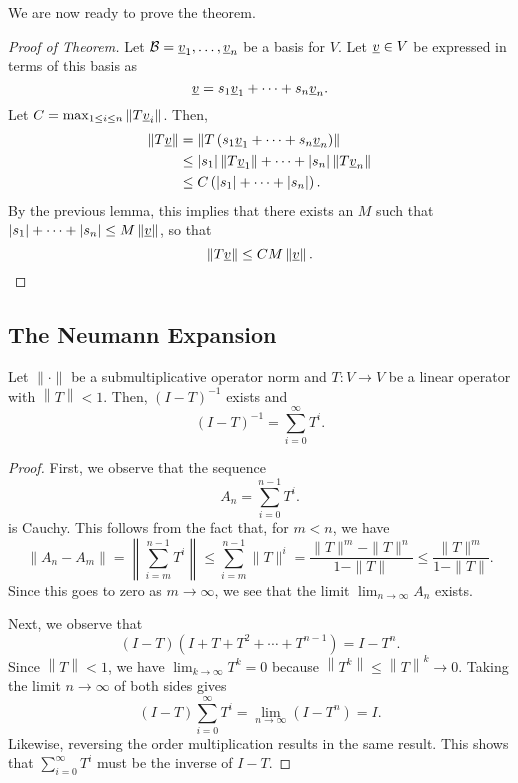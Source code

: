 We are now ready to prove the theorem.
\begin{proof}[Proof of Theorem]
Let $\mathcal{B} = \underline{v}_1, \ldots, \underline{v}_n$ be a basis for $V$.
Let $\underline{v} \in V$ be expressed in terms of this basis as
\begin{equation*}
\underline{v} = s_1 \underline{v}_1 + \cdots + s_n \underline{v}_n .
\end{equation*}
Let $C = \max_{1 \leq i \leq n} \left\| T \underline{v}_i \right\|$.
Then,
\begin{equation*}
\begin{split}
\left\| T \underline{v} \right\| &= \left\| T \left( s_1 \underline{v}_1 + \cdots + s_n \underline{v}_n \right) \right\| \\
& \leq |s_1| \left\| T \underline{v}_1 \right\| + \cdots + |s_n| \left\| T \underline{v}_n \right\| \\
&\leq C \left( |s_1| + \cdots + |s_n| \right) .
\end{split}
\end{equation*}
By the previous lemma, this implies that there exists an $M$ such that $|s_1| + \cdots + |s_n| \leq M \left\| \underline{v} \right\|$, so that
\begin{equation*}
\left\| T \underline{v} \right\| \leq C M \left\| \underline{v} \right\| .
\end{equation*}
\end{proof}



\subsection{The Neumann Expansion}

\begin{theorem}
Let $\| \cdot \|$ be a submultiplicative operator norm and $T : V \rightarrow V$ be a linear operator with $\left\| T \right\| < 1$.
Then, $(I-T)^{-1}$ exists and
\[ (I-T)^{-1} = \sum_{i=0}^{\infty} T^i. \]
\end{theorem}
\begin{proof}
First, we observe that the sequence
\[ A_n = \sum_{i=0}^{n-1} T^i.\]
is Cauchy.  This follows from the fact that, for $m<n$, we have
\[ \| A_n - A_m \| = \left\| \sum_{i=m}^{n-1} T^i \right\| \leq \sum_{i=m}^{n-1} \| T \|^i = \frac{\| T \|^m - \| T \|^n}{1 - \| T \|} \leq  \frac{\| T \|^m}{1 - \| T \|}. \]
Since this goes to zero as $m\rightarrow \infty$, we see that the limit $\lim_{n\rightarrow \infty} A_n$ exists.

Next, we observe that
\[ (I - T) \left( I + T + T^2 + \cdots + T^{n-1} \right) = I - T^n . \]
Since $\left\| T \right\| < 1$, we have $\lim_{k \rightarrow \infty} T^k = 0$ because $\left\| T^k \right\| \leq \left\| T \right\|^k \rightarrow 0$.
Taking the limit $n\rightarrow \infty$ of both sides gives
\[ (I - T) \sum_{i=0}^{\infty} T^i =  \lim_{n \rightarrow \infty} (I - T^n ) = I. \]
Likewise, reversing the order multiplication results in the same result.
This shows that $\sum_{i=0}^{\infty} T^i$ must be the inverse of $I -T$.
\end{proof}

